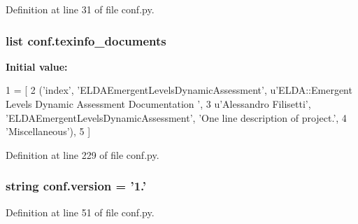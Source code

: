 Definition at line 31 of file conf.\+py.

\hypertarget{a00134_a54b0faed214ac92017d5689efbb10672}{
\subsubsection[{texinfo\+\_\+documents}]{\setlength{\rightskip}{0pt plus 5cm}list conf.\+texinfo\+\_\+documents}}\label{a00134_a54b0faed214ac92017d5689efbb10672}
{\bfseries Initial value\+:}
\begin{DoxyCode}
1 = [
2   (\textcolor{stringliteral}{'index'}, \textcolor{stringliteral}{'ELDAEmergentLevelsDynamicAssessment'}, \textcolor{stringliteral}{u'ELDA::Emergent Levels Dynamic Assessment Documentation
      '},
3    \textcolor{stringliteral}{u'Alessandro Filisetti'}, \textcolor{stringliteral}{'ELDAEmergentLevelsDynamicAssessment'}, \textcolor{stringliteral}{'One line description of project.'},
4    \textcolor{stringliteral}{'Miscellaneous'}),
5 ]
\end{DoxyCode}


Definition at line 229 of file conf.\+py.

\hypertarget{a00134_ade15c5b54093b64d7c428ec19ca5b1cb}{
\subsubsection[{version}]{\setlength{\rightskip}{0pt plus 5cm}string conf.\+version = '1.'}}\label{a00134_ade15c5b54093b64d7c428ec19ca5b1cb}


Definition at line 51 of file conf.\+py.

